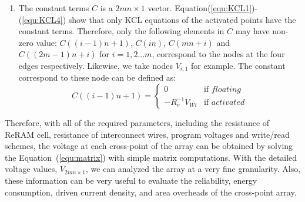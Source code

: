 \begin{enumerate}
  \item The constant terms $C$ is a $2mn{\times}1$ vector. Equation(\ref{equ:KCL1})-(\ref{equ:KCL4}) show that only KCL equations of the activated points have the constant terms. Therefore, only the following elements in $C$ may have non-zero value: $C((i-1)n+1)$, $C(in)$, $C(mn+i)$ and $C((2m-1)n+i)$ for $i=1,2...m$, correspond to the nodes at the four edges respectively. Likewise, we take nodes $V_{i,1}$ for example. The constant correspond to these node can be defined as:
    \begin{equation}
    C((i-1)n+1) = \left\{
    \begin{array}{ll}
    0   & \text{if } floating\\
    -R_v^{-1}V_{Wi}& \text{if } activated
    \end{array} \right.
    \end{equation}
\end{enumerate}

Therefore, with all of the required parameters, including the resistance of ReRAM cell, resistance of interconnect wires, program voltages and write/read schemes, the voltage at each cross-point of the array can be obtained by solving the Equation~(\ref{equ:matrix}) with simple matrix computations. With the detailed voltage values, $V_{2mn{\times}1}$, we can analyzed the array at a very fine granularity. Also, these information can be very useful to evaluate the reliability, energy consumption, driven current density, and area overheads of the cross-point array. 
